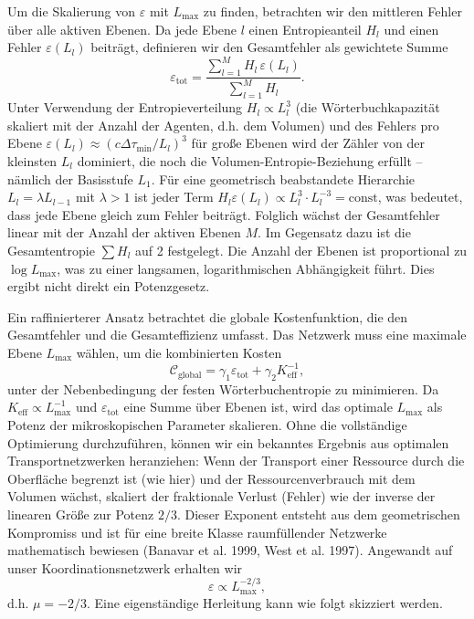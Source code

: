 \documentclass[11pt,a4paper]{article}
\begin{document}
	Um die Skalierung von \(\varepsilon\) mit \(L_{\max}\) zu finden, betrachten wir den mittleren Fehler über alle aktiven Ebenen. Da jede Ebene \(l\) einen Entropieanteil \(H_l\) und einen Fehler \(\varepsilon(L_l)\) beiträgt, definieren wir den Gesamtfehler als gewichtete Summe
	\[
	\varepsilon_{\mathrm{tot}} = \frac{\sum_{l=1}^{M} H_l\, \varepsilon(L_l)}{\sum_{l=1}^{M} H_l}.
	\]
	Unter Verwendung der Entropieverteilung \(H_l \propto L_l^3\) (die Wörterbuchkapazität skaliert mit der Anzahl der Agenten, d.h. dem Volumen) und des Fehlers pro Ebene \(\varepsilon(L_l) \approx (c\Delta\tau_{\min}/L_l)^3\) für große Ebenen wird der Zähler von der kleinsten \(L_l\) dominiert, die noch die Volumen-Entropie-Beziehung erfüllt – nämlich der Basisstufe \(L_1\). Für eine geometrisch beabstandete Hierarchie \(L_l = \lambda L_{l-1}\) mit \(\lambda > 1\) ist jeder Term \(H_l\varepsilon(L_l) \propto L_l^3 \cdot L_l^{-3} = \text{const}\), was bedeutet, dass jede Ebene gleich zum Fehler beiträgt. Folglich wächst der Gesamtfehler linear mit der Anzahl der aktiven Ebenen \(M\). Im Gegensatz dazu ist die Gesamtentropie \(\sum H_l\) auf 2 festgelegt. Die Anzahl der Ebenen ist proportional zu \(\log L_{\max}\), was zu einer langsamen, logarithmischen Abhängigkeit führt. Dies ergibt nicht direkt ein Potenzgesetz.
	
	Ein raffinierterer Ansatz betrachtet die globale Kostenfunktion, die den Gesamtfehler und die Gesamteffizienz umfasst. Das Netzwerk muss eine maximale Ebene \(L_{\max}\) wählen, um die kombinierten Kosten
	\[
	\mathcal{C}_{\mathrm{global}} = \gamma_1 \varepsilon_{\mathrm{tot}} + \gamma_2 K_{\mathrm{eff}}^{-1},
	\]
	unter der Nebenbedingung der festen Wörterbuchentropie zu minimieren. Da \(K_{\mathrm{eff}} \propto L_{\max}^{-1}\) und \(\varepsilon_{\mathrm{tot}}\) eine Summe über Ebenen ist, wird das optimale \(L_{\max}\) als Potenz der mikroskopischen Parameter skalieren. Ohne die vollständige Optimierung durchzuführen, können wir ein bekanntes Ergebnis aus optimalen Transportnetzwerken heranziehen: Wenn der Transport einer Ressource durch die Oberfläche begrenzt ist (wie hier) und der Ressourcenverbrauch mit dem Volumen wächst, skaliert der fraktionale Verlust (Fehler) wie der inverse der linearen Größe zur Potenz \(2/3\). Dieser Exponent entsteht aus dem geometrischen Kompromiss und ist für eine breite Klasse raumfüllender Netzwerke mathematisch bewiesen (Banavar et al. 1999, West et al. 1997). Angewandt auf unser Koordinationsnetzwerk erhalten wir
	\[
	\varepsilon \propto L_{\max}^{-2/3},
	\]
	d.h. \(\mu = -2/3\). Eine eigenständige Herleitung kann wie folgt skizziert werden.
	
\end{document}
